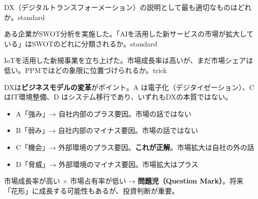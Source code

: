 
\begin{mondai}{DX（デジタルトランスフォーメーション）の説明として最も適切なものはどれか。}{standard}
\end{mondai}

\begin{mondai}{ある企業がSWOT分析を実施した。「AIを活用した新サービスの市場が拡大している」はSWOTのどれに分類されるか。}{standard}
\end{mondai}

\begin{mondai}{IoTを活用した新規事業を立ち上げた。市場成長率は高いが、まだ市場シェアは低い。PPMではどの象限に位置づけられるか。}{trick}
\end{mondai}

\kaitoupage


\begin{kaisetsu}
DXは\textbf{ビジネスモデルの変革}がポイント。A は電子化（デジタイゼーション）、C はIT環境整備、D はシステム移行であり、いずれもDXの本質ではない。
\end{kaisetsu}


\begin{goutoubun}
\begin{itemize}
  \item A「強み」→ 自社内部のプラス要因。市場の話ではない
  \item B「弱み」→ 自社内部のマイナス要因。市場の話ではない
  \item C「機会」→ 外部環境のプラス要因。\textbf{これが正解}。市場拡大は自社の外の話
  \item D「脅威」→ 外部環境のマイナス要因。市場拡大はプラス
\end{itemize}
\end{goutoubun}


\begin{kaisetsu}
市場成長率が高い × 市場占有率が低い → \textbf{問題児（Question Mark）}。将来「花形」に成長する可能性もあるが、投資判断が重要。
\end{kaisetsu}

